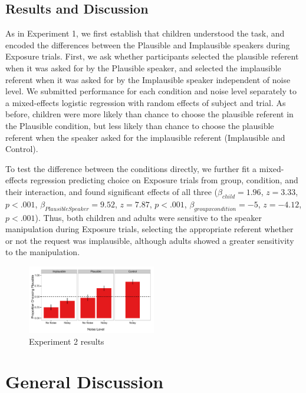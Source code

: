 \documentclass[man,floatsintext]{apa6}
\begin{document}
\subsection{Results and Discussion}

As in Experiment 1, we first establish that children understood the task, and encoded the differences between the Plausible and Implausible speakers during Exposure trials. First, we ask whether participants selected the plausible referent when it was asked for by the Plausible speaker, and selected the implausible referent when it was asked for by the Implausible speaker independent of noise level. We submitted performance for each condition and noise level separately to a mixed-effects logistic regression with random effects of subject and trial. As before, children were more likely than chance to choose the plausible referent in the Plausible condition, but less likely than chance to choose the plausible referent when the speaker asked for the implausible referent (Implausible and Control).  

To test the difference between the conditions directly, we further fit a mixed-effects regression predicting choice on Exposure trials from group, condition, and their interaction, and found significant effects of all three ($\beta_{child} = 1.96$,  $z = 3.33$, $p <.001$, $\beta_{Plausible Speaker} = 9.52$,  $z = 7.87$, $p <.001$,  $\beta_{group x condition} = -5$,  $z = -4.12$, $p <.001$). Thus, both children and adults were sensitive to the speaker manipulation during Exposure trials, selecting the appropriate referent whether or not the request was implausible, although adults showed a greater sensitivity to the manipulation.



\begin{figure}[t]
     \begin{center}
     \includegraphics[width=0.5\textwidth]{figures/exp2_results.pdf}
    \end{center}
    \caption{Experiment 2 results}%
   \label{fig:exp2_results}
\end{figure}

\section{General Discussion}
\end{document}
